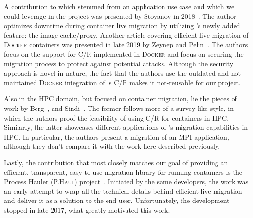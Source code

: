 A contribution to \criu which stemmed from an application use case and which we could leverage in the project was presented by Stoyanov in 2018~\cite{Stoyanov2018}.
The author optimizes downtime during container live migration by utilizing \criu's newly added feature: the image cache/proxy.
Another article covering efficient live migration of \textsc{Docker} containers was presented in late 2019 by Zeynep and Pelin~\cite{Zeynep2019}.
The authors focus on the support for C/R implemented in \textsc{Docker} and focus on securing the migration process to protect against potential attacks.
Although the security approach is novel in nature, the fact that the authors use the outdated and not-maintained \textsc{Docker} integration of \criu's C/R makes it not-reusable for our project.

Also in the HPC domain, but focused on container migration, lie the pieces of work by Berg~\cite{Berg2017}, and Sindi~\cite{Sindi2019}.
The former follows more of a survey-like style, in which the authors proof the feasibility of using C/R for containers in HPC.
Similarly, the latter showcases different applications of \criu's migration capabilities in HPC.
In particular, the authors present a migration of an MPI application, although they don't compare it with the work here described previously.

Lastly, the contribution that most closely matches our goal of providing an efficient, transparent, easy-to-use migration library for running containers is the Process Hauler (\textsc{P.Haul}) project~\cite{phaul-criu,phaul-github}.
Initiated by the same \criu developers, the work was an early attempt to wrap all the technical details behind efficient live migration and deliver it as a solution to the end user.
Unfortunately, the development stopped in late 2017, what greatly motivated this work.
